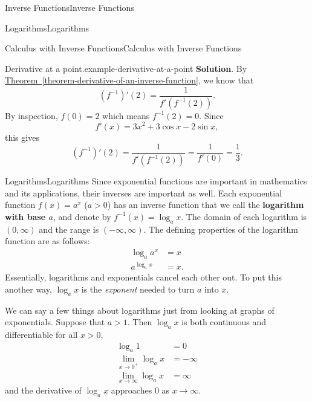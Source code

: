 \documentclass[10pt,]{book}
\newcommand{\terminology}[1]{\textbf{#1}}
\numberwithin{equation}{section}
\begin{document}
\begin{chapterptx}{Inverse Functions}{}{Inverse Functions}{}{}
\begin{sectionptx}{Logarithms}{}{Logarithms}{}{}
\begin{subsectionptx}{Calculus with Inverse Functions}{}{Calculus with Inverse Functions}{}{}
\begin{example}{Derivative at a point.}{example-derivative-at-a-point}
\noindent\textbf{Solution}.\hypertarget{solution-47}{}\quad%
\hypertarget{p-216}{}%
By \hyperref[theorem-derivative-of-an-inverse-function]{Theorem~\ref{theorem-derivative-of-an-inverse-function}}, we know that%
\begin{equation*}
(f^{-1})'(2) = \frac{1}{f'(f^{-1}(2))}.
\end{equation*}
By inspection, \(f(0) = 2\) which means \(f^{-1}(2) = 0\). Since%
\begin{equation*}
f'(x) = 3x^{2} + 3\cos x - 2\sin x,
\end{equation*}
this gives%
\begin{equation*}
(f^{-1})'(2) = \frac{1}{f'(f^{-1}(2))} = \frac{1}{f'(0)} = \frac{1}{3}.
\end{equation*}
%
\end{example}
\end{subsectionptx}
%
%
\typeout{************************************************}
\typeout{************************************************}
%
\begin{subsectionptx}{Logarithms}{}{Logarithms}{}{}\label{subsection-logarithms}
\hypertarget{p-217}{}%
Since exponential functions are important in mathematics and its applications, their inverses are important as well. Each exponential function \(f(x) = a^{x}\) (\(a> 0\)) has an inverse function that we call the \terminology{logarithm with base \(a\)}, and denote by \(f^{-1}(x) = \log_{a}x\). The domain of each logarithm is \((0,\infty)\) and the range is \((-\infty,\infty)\). The defining properties of the logarithm function are as follows:%
\begin{align*}
\log_{a}a^{x} & = x \\
a^{\log_{a}x} & = x. 
\end{align*}
Essentially, logarithms and exponentials cancel each other out. To put this another way, \(\log_{a}x\) is the \emph{exponent} needed to turn \(a\) into \(x\).%
\par
\hypertarget{p-218}{}%
We can say a few things about logarithms just from looking at graphs of exponentials. Suppose that \(a>1\). Then \(\log_{a}x\) is both continuous and differentiable for all \(x>0\),%
\begin{align*}
\log_{a}1 & = 0 \\
\lim_{x\to0^{+}}\log_{a}x & = -\infty \\
\lim_{x\to\infty}\log_{a}x & = \infty 
\end{align*}
and the derivative of \(\log_{a}x\) approaches \(0\) as \(x\to\infty\).%

\end{subsectionptx}
\end{sectionptx}
\end{chapterptx}
\end{document}
